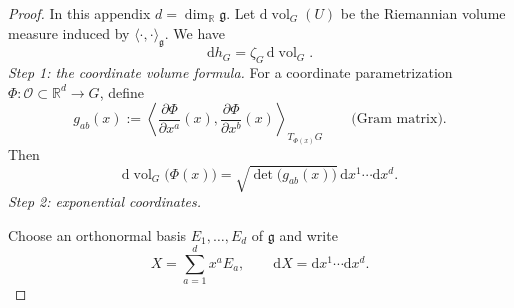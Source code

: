 \documentclass[10pt,reqno]{amsart}
\theoremstyle{definition}
\theoremstyle{remark}
\numberwithin{equation}{section}
\numberwithin{figure}{section}
\newcommand{\g}{\mathfrak g}
\newcommand{\dd}{\mathrm d}
\newcommand{\R}{\mathbb R}
\begin{document}
\begin{proof} In this appendix $d=\dim_\R\g$. Let $\dd\operatorname{vol}_G(U)$ be the Riemannian volume measure induced by
$\langle\cdot,\cdot\rangle_\g$. We have
\begin{equation}\label{eq:display-105}
\dd h_G=\zeta_G\,\dd\operatorname{vol}_G.
\end{equation}
\smallskip\noindent\emph{Step 1: the coordinate volume formula.}
For a coordinate parametrization $\Phi:\mathcal O\subset\R^d\to G$, define
\begin{equation}\label{eq:display-106}
g_{ab}(x):=
\left\langle\frac{\partial\Phi}{\partial x^a}(x),
\frac{\partial\Phi}{\partial x^b}(x)\right\rangle_{T_{\Phi(x)}G}
\qquad\text{(Gram matrix)}.
\end{equation}
Then
\begin{equation}\label{eq:display-107}
\dd\operatorname{vol}_G\bigl(\Phi(x)\bigr)
=\sqrt{\det\bigl(g_{ab}(x)\bigr)}\,\dd x^1\cdots\dd x^d.
\end{equation}
\smallskip\noindent\emph{Step 2: exponential coordinates.}

Choose an orthonormal basis $E_1,\ldots,E_d$ of $\g$ and write
\begin{equation}\label{eq:display-108}
X=\sum_{a=1}^d x^aE_a,
\qquad \dd X=\dd x^1\cdots\dd x^d.
\end{equation}


\end{proof}
\end{document}

